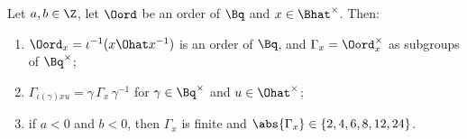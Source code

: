 Let $a,b\in\Z$, let $\Oord$ be an order of $\Bq$ and $x\in\Bhat^\times$. Then:
\begin{enumerate}[label=(\alph*)]
\item $\Oord_x=\iota^{-1}(x\Ohat x^{-1})$ is an order of $\Bq$, and $\Gamma_x=\Oord_x^\times$ as subgroups of $\Bq^\times$;
\item $\Gamma_{\iota(\gamma)xu}=\gamma\,\Gamma_x\,\gamma^{-1}$ for $\gamma\in\Bq^\times$ and $u\in\Ohat^\times$;
\item if $a<0$ and $b<0$, then $\Gamma_x$ is finite and $\abs{\Gamma_x}\in\{2,4,6,8,12,24\}$.
\end{enumerate}
